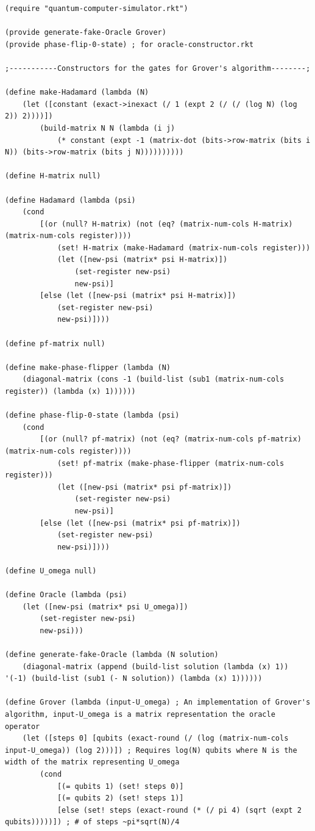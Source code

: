 \documentclass[11pt]{report}
\newcommand{\?}{\stackrel{?}{=}}
\begin{document}
\begin{appendix}
\begin{lstlisting}
(require "quantum-computer-simulator.rkt")

(provide generate-fake-Oracle Grover)
(provide phase-flip-0-state) ; for oracle-constructor.rkt

;-----------Constructors for the gates for Grover's algorithm--------;

(define make-Hadamard (lambda (N)
	(let ([constant (exact->inexact (/ 1 (expt 2 (/ (/ (log N) (log 2)) 2))))])
		(build-matrix N N (lambda (i j)
			(* constant (expt -1 (matrix-dot (bits->row-matrix (bits i N)) (bits->row-matrix (bits j N))))))))))

(define H-matrix null)

(define Hadamard (lambda (psi)
	(cond
		[(or (null? H-matrix) (not (eq? (matrix-num-cols H-matrix) (matrix-num-cols register))))
			(set! H-matrix (make-Hadamard (matrix-num-cols register)))
			(let ([new-psi (matrix* psi H-matrix)])
				(set-register new-psi)
				new-psi)]
		[else (let ([new-psi (matrix* psi H-matrix)])
			(set-register new-psi)
			new-psi)])))

(define pf-matrix null)

(define make-phase-flipper (lambda (N)
	(diagonal-matrix (cons -1 (build-list (sub1 (matrix-num-cols register)) (lambda (x) 1))))))

(define phase-flip-0-state (lambda (psi)
	(cond
		[(or (null? pf-matrix) (not (eq? (matrix-num-cols pf-matrix) (matrix-num-cols register))))
			(set! pf-matrix (make-phase-flipper (matrix-num-cols register)))
			(let ([new-psi (matrix* psi pf-matrix)])
				(set-register new-psi)
				new-psi)]
		[else (let ([new-psi (matrix* psi pf-matrix)])
			(set-register new-psi)
			new-psi)])))

(define U_omega null)

(define Oracle (lambda (psi)
	(let ([new-psi (matrix* psi U_omega)])
		(set-register new-psi)
		new-psi)))

(define generate-fake-Oracle (lambda (N solution)
	(diagonal-matrix (append (build-list solution (lambda (x) 1)) '(-1) (build-list (sub1 (- N solution)) (lambda (x) 1))))))

(define Grover (lambda (input-U_omega) ; An implementation of Grover's algorithm, input-U_omega is a matrix representation the oracle operator
	(let ([steps 0] [qubits (exact-round (/ (log (matrix-num-cols input-U_omega)) (log 2)))]) ; Requires log(N) qubits where N is the width of the matrix representing U_omega
		(cond
			[(= qubits 1) (set! steps 0)]
			[(= qubits 2) (set! steps 1)]
			[else (set! steps (exact-round (* (/ pi 4) (sqrt (expt 2 qubits)))))]) ; # of steps ~pi*sqrt(N)/4


\end{lstlisting}
\end{appendix}
\end{document}
